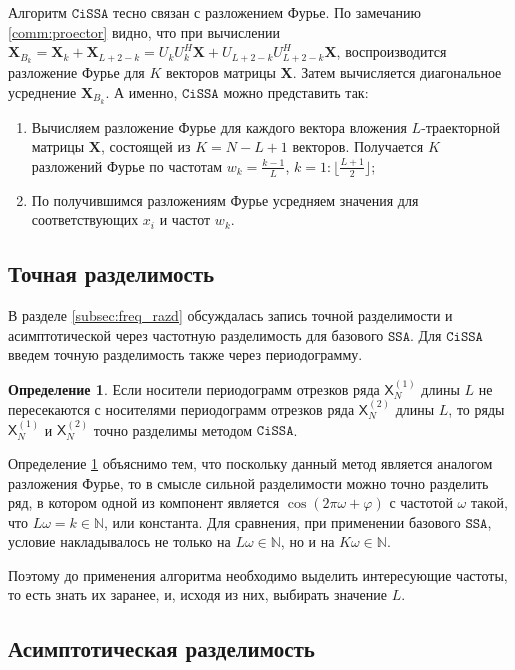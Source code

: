 \documentclass[12pt, specialist, subf
]{disser}
\theoremstyle{definition}
\newcommand{\SSA}{\texttt{SSA}}
\newcommand{\CISSA}{\texttt{CiSSA}}
\newcommand{\TS}{\mathsf{X}}
\newtheorem{definition}{Определение} %
\begin{document}
Алгоритм $\CISSA$ тесно связан с разложением Фурье. По замечанию \ref{comm:proector} видно, что при вычислении $\mathbf X_{B_k} = \mathbf X_k + \mathbf X_{L+2-k} = U_k U_k^H \mathbf X + U_{L+2-k} U_{L+2-k}^H \mathbf X$, воспроизводится разложение Фурье для $K$ векторов матрицы $\mathbf{X}$. Затем вычисляется диагональное усреднение $\mathbf X_{B_k}$. А именно, $\CISSA$ можно представить так:
\begin{enumerate}
	\item Вычисляем разложение Фурье для каждого вектора вложения $L$-траекторной матрицы $\mathbf{X}$, состоящей из $K = N - L + 1$ векторов. Получается $K$ разложений Фурье по частотам $w_k = \frac{k-1}{L}$, $k = 1:\lfloor \frac{L+1}{2} \rfloor$;
	\item По получившимся разложениям Фурье усредняем значения для соответствующих $x_i$ и частот $w_k$.
\end{enumerate}

\subsection{Точная разделимость}

В разделе \ref{subsec:freq_razd} обсуждалась запись точной разделимости и асимптотической через частотную разделимость для базового $\SSA$. Для $\CISSA$ введем точную разделимость также через периодограмму.

\begin{definition}
	\label{def:exact_cissa}
	Если носители периодограмм отрезков ряда \( \TS_N^{(1)} \) длины \( L \) не пересекаются с носителями периодограмм отрезков ряда \( \TS_N^{(2)} \) длины \( L \), то ряды \( \TS_N^{(1)} \) и \( \TS_N^{(2)} \) точно разделимы методом $\CISSA$.
\end{definition}


Определение \ref{def:exact_cissa} объяснимо тем, что поскольку данный метод является аналогом разложения Фурье, то в смысле сильной разделимости можно точно разделить ряд, в котором одной из компонент является $\cos(2\pi \omega + \varphi)$ с частотой $\omega$ такой, что $L\omega = k \in \mathbb N$, или константа. Для сравнения, при применении базового $\SSA$, условие накладывалось не только на $L\omega \in \mathbb N$, но и на $K\omega \in \mathbb N$.

Поэтому до применения алгоритма необходимо выделить интересующие частоты, то есть знать их заранее, и, исходя из них, выбирать значение $L$.

\subsection{Асимптотическая разделимость}
\end{document}

